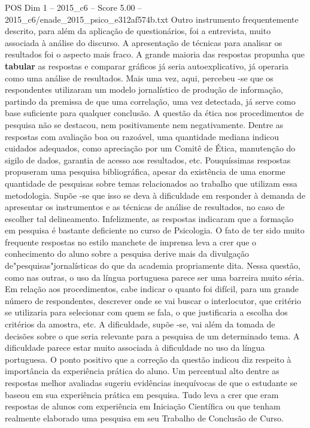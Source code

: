 \begin{textsample}{POS Dim 1 – 2015\_c6 – Score 5.00 – 2015\_c6/enade\_2015\_psico\_e312af574b.txt}
Outro instrumento frequentemente descrito, para além da aplicação de questionários, foi a entrevista, muito associada à análise do discurso.
A apresentação de técnicas para analisar os resultados foi o aspecto mais fraco.
A grande maioria das respostas propunha que \textbf{tabular} as respostas e comparar gráficos já seria autoexplicativo, já operaria como uma análise de resultados.
Mais uma vez, aqui, percebeu -se que os respondentes utilizaram um modelo jornalístico de produção de informação, partindo da premissa de que uma correlação, uma vez detectada, já serve como base suficiente para qualquer conclusão.
A questão da ética nos procedimentos de pesquisa não se destacou, nem positivamente nem negativamente.
Dentre as respostas com avaliação boa ou razoável, uma quantidade mediana indicou cuidados adequados, como apreciação por um Comitê de Ética, manutenção do sigilo de dados, garantia de acesso aos resultados, etc.
Pouquíssimas respostas propuseram uma pesquisa bibliográfica, apesar da existência de uma enorme quantidade de pesquisas sobre temas relacionados ao trabalho que utilizam essa metodologia.
Supõe -se que isso se deva à dificuldade em responder à demanda de apresentar os instrumentos e as técnicas de análise de resultados, no caso de escolher tal delineamento.
Infelizmente, as respostas indicaram que a formação em pesquisa é bastante deficiente no curso de Psicologia.
O fato de ter sido muito frequente respostas no estilo manchete de imprensa leva a crer que o conhecimento do aluno sobre a pesquisa derive mais da divulgação de"pesquisas"jornalísticas do que da academia propriamente dita.
Nessa questão, como nas outras, o uso da língua portuguesa parece ser uma barreira muito séria.
Em relação aos procedimentos, cabe indicar o quanto foi difícil, para um grande número de respondentes, descrever onde se vai buscar o interlocutor, que critério se utilizaria para selecionar com quem se fala, o que justificaria a escolha dos critérios da amostra, etc.
A dificuldade, supõe -se, vai além da tomada de decisões sobre o que seria relevante para a pesquisa de um determinado tema.
A dificuldade parece estar muito associada à dificuldade no uso da língua portuguesa.
O ponto positivo que a correção da questão indicou diz respeito à importância da experiência prática do aluno.
Um percentual alto dentre as respostas melhor avaliadas sugeriu evidências inequívocas de que o estudante se baseou em sua experiência prática em pesquisa.
Tudo leva a crer que eram respostas de alunos com experiência em Iniciação Científica ou que tenham realmente elaborado uma pesquisa em seu Trabalho de Conclusão de Curso.

\end{textsample}
